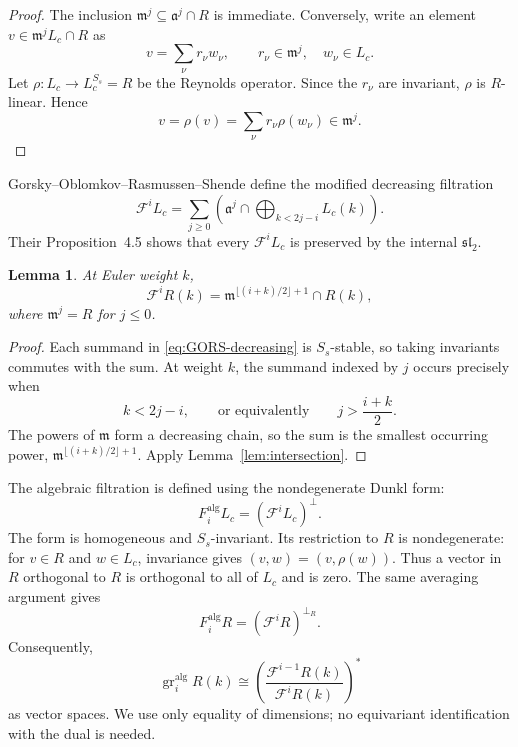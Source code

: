\documentclass[11pt]{article}
\newtheorem{lemma}[theorem]{Lemma}
\newcommand{\gr}{\operatorname{gr}}
\newcommand{\alg}{\mathrm{alg}}
\begin{document}
\begin{proof}
The inclusion $\mathfrak m^j\subseteq\mathfrak a^j\cap R$ is
immediate.  Conversely, write an element
$v\in\mathfrak m^jL_c\cap R$ as
\[
 v=\sum_\nu r_\nu w_\nu,
 \qquad r_\nu\in\mathfrak m^j,
 \quad w_\nu\in L_c.
\]
Let $\rho:L_c\to L_c^{S_s}=R$ be the Reynolds operator.  Since the
$r_\nu$ are invariant, $\rho$ is $R$-linear.  Hence
\[
 v=\rho(v)=\sum_\nu r_\nu\rho(w_\nu)\in\mathfrak m^j.
\]
\end{proof}

Gorsky--Oblomkov--Rasmussen--Shende define the modified decreasing
filtration
\begin{equation}\label{eq:GORS-decreasing}
 \mathcal F^iL_c
 =\sum_{j\geq0}
 \left(
 \mathfrak a^j\cap
 \bigoplus_{k<2j-i}L_c(k)
 \right).
\end{equation}
Their Proposition~4.5 shows that every $\mathcal F^iL_c$ is preserved
by the internal $\mathfrak{sl}_2$.

\begin{lemma}\label{lem:restricted-filtration}
At Euler weight $k$,
\begin{equation}\label{eq:restricted-filtration}
 \mathcal F^iR(k)
 =\mathfrak m^{\lfloor(i+k)/2\rfloor+1}\cap R(k),
\end{equation}
where $\mathfrak m^j=R$ for $j\leq0$.
\end{lemma}

\begin{proof}
Each summand in \eqref{eq:GORS-decreasing} is $S_s$-stable, so taking
invariants commutes with the sum.  At weight $k$, the summand indexed
by $j$ occurs precisely when
\[
 k<2j-i,
 \qquad\text{or equivalently}\qquad
 j>\frac{i+k}{2}.
\]
The powers of $\mathfrak m$ form a decreasing chain, so the sum is the
smallest occurring power,
$\mathfrak m^{\lfloor(i+k)/2\rfloor+1}$.  Apply
Lemma~\ref{lem:intersection}.
\end{proof}

The algebraic filtration is defined using the nondegenerate Dunkl
form:
\begin{equation}\label{eq:orthogonal-filtration}
 F_i^{\alg}L_c=(\mathcal F^iL_c)^\perp.
\end{equation}
The form is homogeneous and $S_s$-invariant.  Its restriction to $R$
is nondegenerate: for $v\in R$ and $w\in L_c$, invariance gives
$(v,w)=(v,\rho(w))$.  Thus a vector in $R$ orthogonal to $R$ is
orthogonal to all of $L_c$ and is zero.  The same averaging argument
gives
\[
 F_i^{\alg}R=(\mathcal F^iR)^{\perp_R}.
\]
Consequently,
\begin{equation}\label{eq:duality}
 \gr_i^{\alg}R(k)
 \cong
 \left(
 \frac{\mathcal F^{i-1}R(k)}{\mathcal F^iR(k)}
 \right)^*
\end{equation}
as vector spaces.  We use only equality of dimensions; no equivariant
identification with the dual is needed.
\end{document}
